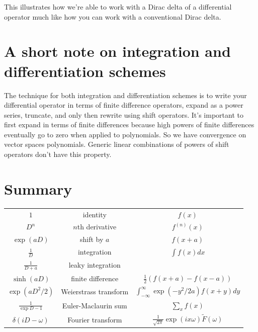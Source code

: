 \documentclass[a4paper]{article}
\theoremstyle{definition}
\begin{document}
This illustrates how we're able to work with a Dirac delta of a differential operator much like how you can work with a conventional Dirac delta.


%

\section{A short note on integration and differentiation schemes}
The technique for both integration and differentiation schemes is to write your differential operator in terms of finite difference operators, expand as a power series, truncate, and only then rewrite using shift operators.
It's important to first expand in terms of finite differences because high powers of finite differences eventually go to zero when applied to polynomials.
So we have convergence on vector spaces polynomials.
Generic linear combinations of powers of shift operators don't have this property.

\section{Summary}
\begin{center}
\tabulinesep=1.2mm
\begin{tabu}{|c|c|c|}
\hline
$1$ & identity & $f(x)$ \\
$D^n$ & $n$th derivative & $f^{(n)}(x)$ \\
$\exp(aD)$ & shift by $a$ & $f(x+a)$ \\
$\frac{1}{D}$ & integration & $\int f(x)dx$ \\
$\frac{1}{D+a}$ & leaky integration & \\
$\sinh(aD)$ & finite difference & $\frac{1}{2}(f(x+a)-f(x-a))$ \\
$\exp(aD^2/2)$ & Weierstrass transform & $\int_{-\infty}^\infty \exp(-y^2/2a) f(x+y)dy$ \\
$\frac{1}{\exp D-1}$ & Euler-Maclaurin sum & $\sum_x f(x)$ \\
$\delta(iD-\omega)$ & Fourier transform & $\frac{1}{\sqrt{2\pi}}\exp(ix\omega)\tilde{F}(\omega)$ \\
\hline
\end{tabu}
\end{center}
\end{document}
